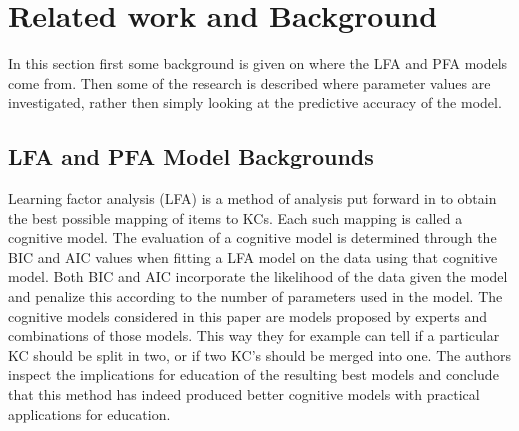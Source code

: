 \documentclass{scrartcl}
\newcommand\todo[1]{\textit{\textcolor{red}{#1}}}
\begin{document}

\section{Related work and Background}
\label{sec:RW}
In this section first some background is given on where the LFA and PFA models come from. Then some of the research is described where parameter values are investigated, rather then simply looking at the predictive accuracy of the model. 
\subsection{LFA and PFA Model Backgrounds}
Learning factor analysis (LFA) is a method of analysis put forward in \cite{lfa} to obtain the best possible mapping of items to KCs. Each such mapping is called a cognitive model. The evaluation of a cognitive model is determined through the BIC and AIC values when fitting a LFA model on the data using that cognitive model. Both BIC and AIC incorporate the likelihood of the data given the model and penalize this according to the number of parameters used in the model. The cognitive models considered in this paper are models proposed by experts and combinations of those models. This way they for example can tell if a particular KC should be split in two, or if two KC's should be merged into one. The authors inspect the implications for education of the resulting best models and conclude that this method has indeed produced better cognitive models with practical applications for education. 
\end{document}
